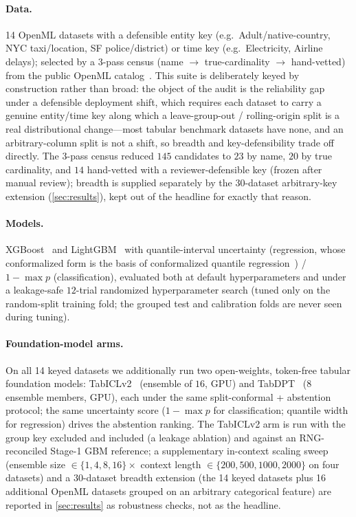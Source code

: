 \documentclass[pdflatex,sn-mathphys-num]{sn-jnl}
\begin{document}
\paragraph{Data.} 14 OpenML datasets with a defensible entity key (e.g.\ Adult/native-country,
NYC taxi/location, SF police/district) or time key (e.g.\ Electricity,
Airline delays); selected by a 3-pass census (name $\to$ true-cardinality $\to$ hand-vetted)
from the public OpenML catalog~\citep{vanschoren2014openml}.
This suite is deliberately keyed by construction rather than broad: the object of the audit is the
reliability gap under a defensible deployment shift, which requires each dataset to carry a genuine
entity/time key along which a leave-group-out / rolling-origin split is a real distributional change---most
tabular benchmark datasets have none, and an arbitrary-column split is not a shift, so breadth and
key-defensibility trade off directly. The 3-pass census reduced $145$ candidates to $23$ by name, $20$ by true cardinality, and
$14$ hand-vetted with a reviewer-defensible key (frozen after manual review); breadth is supplied
separately by the $30$-dataset arbitrary-key extension (\cref{sec:results}), kept out of the headline for
exactly that reason.
\paragraph{Models.} XGBoost~\citep{chen2016xgboost} and LightGBM~\citep{ke2017lightgbm} with quantile-interval uncertainty
(regression, whose conformalized form is the basis of conformalized quantile regression~\citep{romano2019cqr}) / $1-\max p$ (classification), evaluated both at default hyperparameters and under a
leakage-safe $12$-trial randomized hyperparameter search (tuned only on the random-split training fold; the
grouped test and calibration folds are never seen during tuning).
\paragraph{Foundation-model arms.} On all 14 keyed datasets we additionally run two open-weights, token-free
tabular foundation models: TabICLv2~\citep{qu2026tabicl} (ensemble of $16$,
GPU) and TabDPT~\citep{ma2024tabdpt} ($8$ ensemble members, GPU), each under the same
split-conformal + abstention protocol; the same uncertainty score ($1-\max p$ for classification; quantile
width for regression) drives the abstention ranking. The TabICLv2 arm is run with the group key excluded and
included (a leakage ablation) and against an RNG-reconciled Stage-1 GBM reference; a supplementary in-context scaling
sweep (ensemble size $\in\{1,4,8,16\}\times$ context length $\in\{200,500,1000,2000\}$ on four datasets) and a
$30$-dataset breadth extension (the 14 keyed datasets plus 16 additional OpenML datasets grouped on an
arbitrary categorical feature) are reported in \cref{sec:results} as robustness checks, not as the headline.
\end{document}
